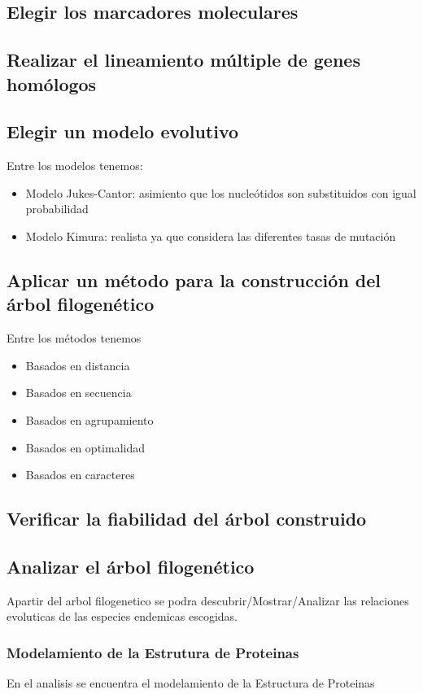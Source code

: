 \documentclass[a4paper]{article}
\begin{document}
\subsection{Elegir los marcadores moleculares}
\subsection{Realizar el lineamiento múltiple de genes homólogos}
\subsection{Elegir un modelo evolutivo}
Entre los modelos tenemos:

\begin{itemize}
\item Modelo Jukes-Cantor: asimiento que los nucleótidos son substituidos con igual probabilidad
\item Modelo Kimura: realista ya que considera las diferentes tasas de mutación
\end{itemize}
\subsection{Aplicar un método para la construcción del árbol filogenético}	
Entre los métodos tenemos 
\begin{itemize}
	\item Basados en distancia
	\item Basados en secuencia
	\item Basados en agrupamiento
	\item Basados en optimalidad
	\item Basados en caracteres
\end{itemize}

\subsection{Verificar la fiabilidad del árbol construido}

\subsection{Analizar el árbol filogenético}
Apartir del arbol filogenetico se podra descubrir/Mostrar/Analizar las relaciones evoluticas de las especies endemicas escogidas.
\subsubsection{Modelamiento de la Estrutura de Proteinas}
En el analisis se encuentra el modelamiento de la Estructura de Proteinas
\end{document}
